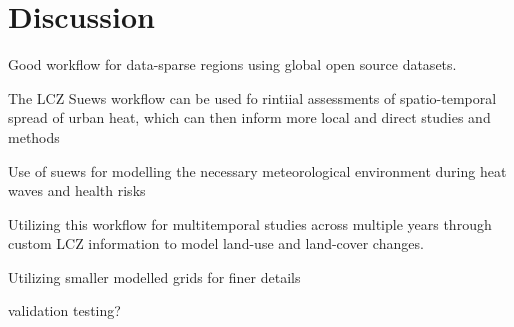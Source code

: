 \section{Discussion}

Good workflow for data-sparse regions using global open source datasets.



The LCZ Suews workflow can be used fo rintiial assessments of spatio-temporal spread of urban heat, which can then inform more local and direct studies and methods 









 Use of \Gls{suews} for modelling the necessary meteorological environment during heat waves and health risks


Utilizing this workflow for multitemporal studies across multiple years through custom LCZ information to model land-use and land-cover changes. 

Utilizing smaller modelled grids for finer details

validation testing?


